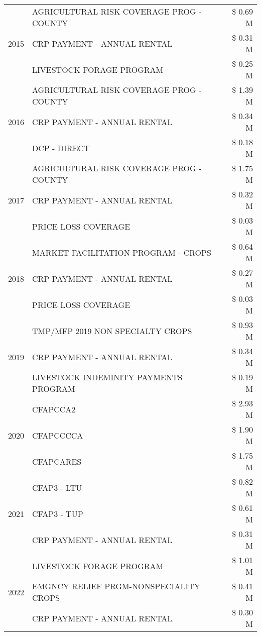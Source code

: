 \begin{tabular}{llr}
\cline{1-3}
\multirow[t]{3}{*}{2015} & AGRICULTURAL RISK COVERAGE PROG - COUNTY & \$ 0.69 M \\
 & CRP PAYMENT - ANNUAL RENTAL & \$ 0.31 M \\
 & LIVESTOCK FORAGE PROGRAM & \$ 0.25 M \\
\cline{1-3}
\multirow[t]{3}{*}{2016} & AGRICULTURAL RISK COVERAGE PROG - COUNTY & \$ 1.39 M \\
 & CRP PAYMENT - ANNUAL RENTAL & \$ 0.34 M \\
 & DCP - DIRECT & \$ 0.18 M \\
\cline{1-3}
\multirow[t]{3}{*}{2017} & AGRICULTURAL RISK COVERAGE PROG - COUNTY & \$ 1.75 M \\
 & CRP PAYMENT - ANNUAL RENTAL & \$ 0.32 M \\
 & PRICE LOSS COVERAGE & \$ 0.03 M \\
\cline{1-3}
\multirow[t]{3}{*}{2018} & MARKET FACILITATION PROGRAM - CROPS & \$ 0.64 M \\
 & CRP PAYMENT - ANNUAL RENTAL & \$ 0.27 M \\
 & PRICE LOSS COVERAGE & \$ 0.03 M \\
\cline{1-3}
\multirow[t]{3}{*}{2019} & TMP/MFP 2019 NON SPECIALTY CROPS & \$ 0.93 M \\
 & CRP PAYMENT - ANNUAL RENTAL & \$ 0.34 M \\
 & LIVESTOCK INDEMINITY PAYMENTS PROGRAM & \$ 0.19 M \\
\cline{1-3}
\multirow[t]{3}{*}{2020} & CFAPCCA2 & \$ 2.93 M \\
 & CFAPCCCCA & \$ 1.90 M \\
 & CFAPCARES & \$ 1.75 M \\
\cline{1-3}
\multirow[t]{3}{*}{2021} & CFAP3 - LTU & \$ 0.82 M \\
 & CFAP3 - TUP & \$ 0.61 M \\
 & CRP PAYMENT - ANNUAL RENTAL & \$ 0.31 M \\
\cline{1-3}
\multirow[t]{3}{*}{2022} & LIVESTOCK FORAGE PROGRAM & \$ 1.01 M \\
 & EMGNCY RELIEF PRGM-NONSPECIALITY CROPS & \$ 0.41 M \\
 & CRP PAYMENT - ANNUAL RENTAL & \$ 0.30 M \\
\cline{1-3}
\bottomrule
\end{tabular}
